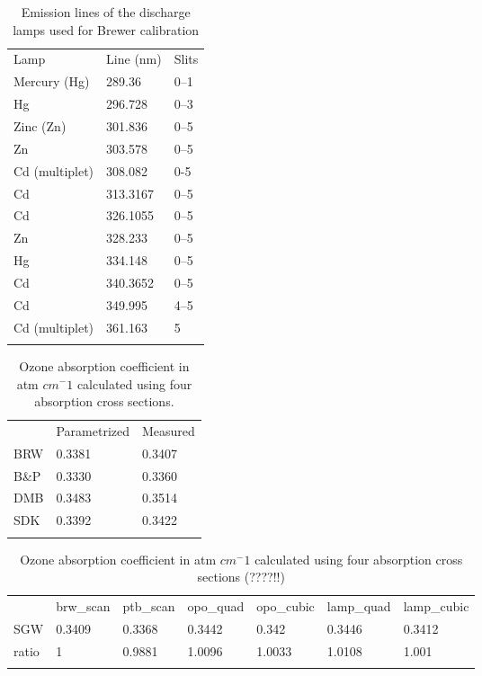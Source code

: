 \documentclass[acp, manuscript]{copernicus}
\begin{document}
\begin{table}[t]
\caption{Emission lines of the discharge lamps used for Brewer calibration}
\begin{tabular}{lll}
\tophline
Lamp           & Line (nm) & Slits \\
\middlehline
Mercury (Hg)   & 289.36    & 0–1   \\
Hg             & 296.728   & 0–3   \\
Zinc (Zn)      & 301.836   & 0–5   \\
Zn             & 303.578   & 0–5   \\
Cd (multiplet) & 308.082   & 0-5   \\
Cd             & 313.3167  & 0–5   \\
Cd             & 326.1055  & 0–5   \\
Zn             & 328.233   & 0–5   \\
Hg             & 334.148   & 0–5   \\
Cd             & 340.3652  & 0–5   \\
Cd             & 349.995   & 4–5   \\
Cd (multiplet) & 361.163   & 5     \\
\bottomhline
\end{tabular}
\belowtable{} %
\label{tab:dsp_lines}
\end{table}



\begin{table}[t]
\caption{Ozone absorption coefficient in atm $cm^-1$ calculated using four absorption cross sections.}
\begin{tabular}{lll}
\tophline
     & Parametrized & Measured \\
\middlehline
BRW  & 0.3381       & 0.3407   \\
B\&P & 0.3330       & 0.3360    \\
DMB  & 0.3483       & 0.3514   \\
SDK  & 0.3392       & 0.3422    \\
\bottomhline
\end{tabular}
\belowtable{} %
\label{tab:slit_param}
\end{table}


\begin{table}[t]
\caption{Ozone absorption coefficient in atm $cm^-1$ calculated using  four absorption cross sections (????!!)}
\begin{tabular}{lllllll}
\tophline
     & brw\_scan & ptb\_scan & opo\_quad & opo\_cubic & lamp\_quad & lamp\_cubic \\
\middlehline
SGW   & 0.3409    & 0.3368    & 0.3442    & 0.342      & 0.3446     & 0.3412      \\
ratio & 1         & 0.9881    & 1.0096    & 1.0033     & 1.0108     & 1.001      \\
\bottomhline
\end{tabular}

\belowtable{} %
\label{tab:o3abs_sum}
\end{table}
\end{document}
